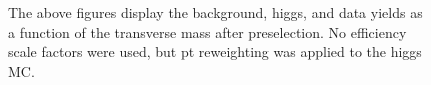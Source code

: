 \begin{figure}[!hbtp]
\begin{center}
\label{}
\caption{The above figures display the background, higgs, and data yields as a function of the transverse mass after preselection. No efficiency scale factors were used, but pt reweighting was applied to the higgs MC.}
\end{center}
\end{figure}
